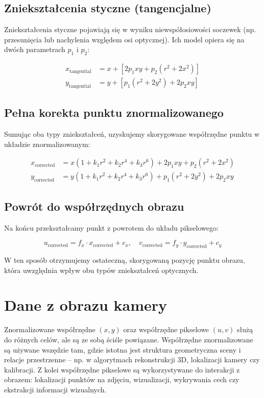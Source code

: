 \documentclass[magisterska]{pracadypl}
\begin{document}
\subsection*{Zniekształcenia styczne (tangencjalne)}

Zniekształcenia styczne pojawiają się w wyniku niewspółosiowości soczewek (np. przesunięcia lub nachylenia względem osi optycznej). Ich model opiera się na dwóch parametrach \( p_1 \) i \( p_2 \):

\begin{align*}
x_{\text{tangential}} &= x + \left[2p_1 x y + p_2 (r^2 + 2x^2)\right] \\
y_{\text{tangential}} &= y + \left[p_1 (r^2 + 2y^2) + 2p_2 x y\right]
\end{align*}

\subsection*{Pełna korekta punktu znormalizowanego}

Sumując oba typy zniekształceń, uzyskujemy skorygowane współrzędne punktu w układzie znormalizowanym:

\begin{align*}
x_{\text{corrected}} &= x(1 + k_1 r^2 + k_2 r^4 + k_3 r^6) + 2p_1 x y + p_2 (r^2 + 2x^2) \\
y_{\text{corrected}} &= y(1 + k_1 r^2 + k_2 r^4 + k_3 r^6) + p_1 (r^2 + 2y^2) + 2p_2 x y
\end{align*}

\subsection*{Powrót do współrzędnych obrazu}

Na końcu przekształcamy punkt z powrotem do układu pikselowego:

\[
u_{\text{corrected}} = f_x \cdot x_{\text{corrected}} + c_x, \quad
v_{\text{corrected}} = f_y \cdot y_{\text{corrected}} + c_y
\]

W ten sposób otrzymujemy ostateczną, skorygowaną pozycję punktu obrazu, która uwzględnia wpływ obu typów zniekształceń optycznych.

\section*{Dane z obrazu kamery}

Znormalizowane współrzędne $(x, y)$ oraz współrzędne pikselowe $(u, v)$ służą do różnych celów, ale są ze sobą ściśle powiązane. Współrzędne znormalizowane są używane wszędzie tam, gdzie istotna jest struktura geometryczna sceny i relacje przestrzenne – np. w algorytmach rekonstrukcji 3D, lokalizacji kamery czy kalibracji. Z kolei współrzędne pikselowe są wykorzystywane do interakcji z obrazem: lokalizacji punktów na zdjęciu, wizualizacji, wykrywania cech czy ekstrakcji informacji wizualnych.
\end{document}
